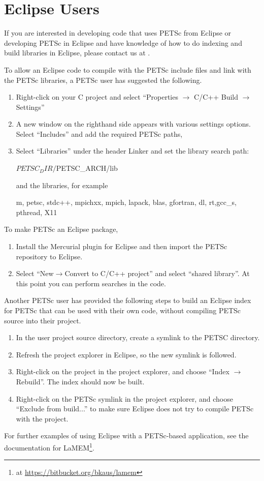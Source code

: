 {{\section{Eclipse Users} 
If you are interested in developing code that uses PETSc from Eclipse or developing PETSc in Eclipse and have knowledge of how to do indexing and build libraries in Eclipse, please contact us at \href{mailto:petsc-dev@mcs.anl.gov}{}.

To allow an Eclipse code to compile with the PETSc include files and link with the PETSc libraries, a PETSc user has suggested the following.
\begin{enumerate}
  \item Right-click on your C project and select ``Properties $\rightarrow$ C/C++ Build $\rightarrow$ Settings''
\item A new window on the righthand side appears with various settings options.
Select ``Includes'' and add the required PETSc paths,
\item Select ``Libraries'' under the header Linker
and set the library search path:
\begin{bashlisting}
${PETSC_DIR}/${PETSC_ARCH}/lib
\end{bashlisting}
and the libraries, for example
\begin{bashlisting}
m, petsc, stdc++, mpichxx, mpich, lapack, blas, gfortran, dl, rt,gcc_s, pthread, X11
\end{bashlisting}
\end{enumerate}
To make PETSc an Eclipse package,
\begin{enumerate}
\item Install the Mercurial plugin for Eclipse and then import the PETSc repository to Eclipse.
\item Select ``New$\rightarrow$Convert to C/C++ project'' and select ``shared library''. At this point you can perform searches in the code.
\end{enumerate}
Another PETSc user has provided the following steps to build an Eclipse index for PETSc that can be used with their own code, without compiling PETSc source into their project.
\begin{enumerate}
\item In the user project source directory, create a symlink to the PETSC  directory.
\item Refresh the project explorer in Eclipse, so the new symlink is followed.
\item Right-click on the project in the project explorer, and choose ``Index $\rightarrow$ Rebuild''. The index should now be built.
\item Right-click on the PETSc symlink in the project explorer, and choose ``Exclude from build...'' to make sure Eclipse does not try to compile PETSc with the project.
\end{enumerate}
For further examples of using Eclipse with a PETSc-based application, see the documentation for LaMEM\footnote{ at \url{https://bitbucket.org/bkaus/lamem}}.

}}

